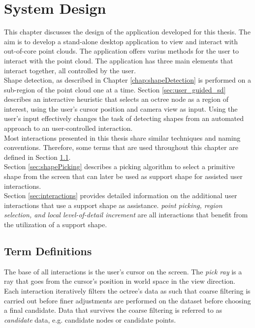 \chapter{System Design}
\label{chap:systemDesign}

This chapter discusses the design of the application developed for this thesis. The aim is to develop a stand-alone desktop application to view and interact with out-of-core point clouds. The application offers varius methods for the user to interact with the point cloud. The application has three main elements that interact together, all controlled by the user. 
\\
Shape detection, as described in Chapter \ref{chap:shapeDetection} is performed on a sub-region of the point cloud one at a time. Section \ref{sec:user_guided_sd} describes an interactive heuristic that selects an octree node as a region of interest, using the user's cursor position and camera view as input. Using the user's input effectively changes the task of detecting shapes from an automated approach to an user-controlled interaction.
\\
Most interactions presented in this thesis share similar techniques and naming conventions. Therefore, some terms that are used throughout this chapter are defined in Section \ref{sec:termDefinitions}. 
\\
Section \ref{sec:shapePicking} describes a picking algorithm to select a primitive shape from the screen that can later be used as support shape for assisted user interactions. 
\\
Section \ref{sec:interactions} provides detailed information on the additional user interactions that use a support shape as assistance. \textit{point picking, region selection, and local level-of-detail increment} are all interactions that benefit from the utilization of a support shape. 



\section{Term Definitions}
\label{sec:termDefinitions}

The base of all interactions is the user's cursor on the screen. The \textit{pick ray} is a ray that goes from the cursor’s position in world space in the view direction. 
Each interaction iteratively filters the octree's data as such that coarse filtering is carried out before finer adjustments are performed on the dataset before choosing a final candidate. Data that survives the coarse filtering is referred to as \textit{candidate} data, e.g. candidate nodes or candidate points. 



